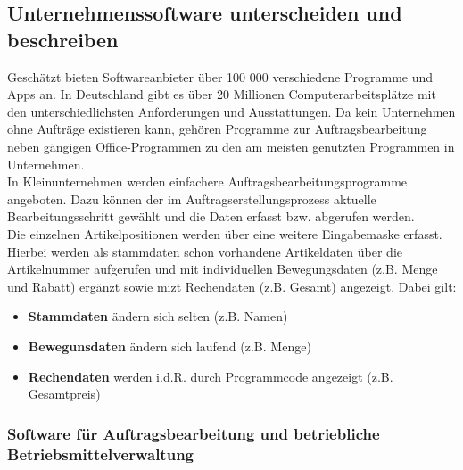 \documentclass[a4paper, 12pt]{report}
\begin{document}
\subsection{Unternehmenssoftware unterscheiden und beschreiben}

Geschätzt bieten Softwareanbieter über 100 000 verschiedene Programme und Apps
an. In Deutschland gibt es über 20 Millionen Computerarbeitsplätze mit den
unterschiedlichsten Anforderungen und Ausstattungen. Da kein Unternehmen ohne
Aufträge existieren kann, gehören Programme zur Auftragsbearbeitung neben
gängigen Office-Programmen zu den am meisten genutzten Programmen in
Unternehmen. \\

In Kleinunternehmen werden einfachere Auftragsbearbeitungsprogramme angeboten.
Dazu können der im Auftragserstellungsprozess aktuelle Bearbeitungsschritt
gewählt und die Daten erfasst bzw. abgerufen werden. \\

Die einzelnen Artikelpositionen werden über eine weitere Eingabemaske erfasst.
Hierbei werden als  stammdaten schon vorhandene Artikeldaten über die
Artikelnummer aufgerufen und mit individuellen Bewegungsdaten (z.B. Menge und
Rabatt) ergänzt sowie mizt Rechendaten (z.B. Gesamt) angezeigt. Dabei  gilt:

\begin{itemize}
    \item \textbf{Stammdaten} ändern sich selten (z.B. Namen)
    \item \textbf{Bewegunsdaten} ändern sich laufend (z.B. Menge)
    \item \textbf{Rechendaten} werden i.d.R. durch Programmcode angezeigt (z.B.
	Gesamtpreis)
\end{itemize}

\subsubsection{Software für Auftragsbearbeitung und betriebliche
Betriebsmittelverwaltung}
\end{document}
